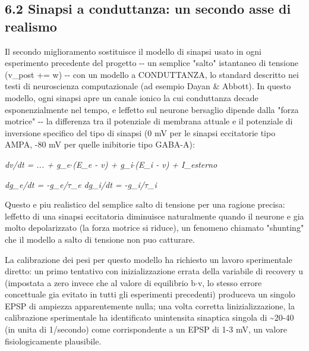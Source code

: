 \documentclass[
  italian,
]{article}
\begin{document}
\subsection{6.2 Sinapsi a conduttanza: un secondo asse di realismo}\label{sinapsi-a-conduttanza-un-secondo-asse-di-realismo}

Il secondo miglioramento sostituisce il modello di sinapsi usato in ogni esperimento precedente del progetto -\/- un semplice "salto" istantaneo di tensione (v\_\allowbreak{}post += w) -\/- con un modello a CONDUTTANZA, lo standard descritto nei testi di neuroscienza computazionale (ad esempio Dayan \& Abbott). In questo modello, ogni sinapsi apre un canale ionico la cui conduttanza decade esponenzialmente nel tempo, e l\textquotesingle effetto sul neurone bersaglio dipende dalla "forza motrice" -\/- la differenza tra il potenziale di membrana attuale e il potenziale di inversione specifico del tipo di sinapsi (0 mV per le sinapsi eccitatorie tipo AMPA, -80 mV per quelle inibitorie tipo GABA-A):

\emph{dv/dt = ... + g\_\allowbreak{}e$\cdot$(E\_\allowbreak{}e - v) + g\_\allowbreak{}i$\cdot$(E\_\allowbreak{}i - v) + I\_\allowbreak{}esterno}

\emph{dg\_\allowbreak{}e/dt = -g\_\allowbreak{}e/$\tau$\_\allowbreak{}e dg\_\allowbreak{}i/dt = -g\_\allowbreak{}i/$\tau$\_\allowbreak{}i}

Questo e\textquotesingle{} piu\textquotesingle{} realistico del semplice salto di tensione per una ragione precisa: l\textquotesingle effetto di una sinapsi eccitatoria diminuisce naturalmente quando il neurone e\textquotesingle{} gia\textquotesingle{} molto depolarizzato (la forza motrice si riduce), un fenomeno chiamato "shunting" che il modello a salto di tensione non puo\textquotesingle{} catturare.

La calibrazione dei pesi per questo modello ha richiesto un lavoro sperimentale diretto: un primo tentativo con inizializzazione errata della variabile di recovery u (impostata a zero invece che al valore di equilibrio b$\cdot$v, lo stesso errore concettuale gia\textquotesingle{} evitato in tutti gli esperimenti precedenti) produceva un singolo EPSP di ampiezza apparentemente nulla; una volta corretta l\textquotesingle inizializzazione, la calibrazione sperimentale ha identificato un\textquotesingle intensita\textquotesingle{} sinaptica singola di \textasciitilde20-40 (in unita\textquotesingle{} di 1/secondo) come corrispondente a un EPSP di 1-3 mV, un valore fisiologicamente plausibile.
\end{document}
